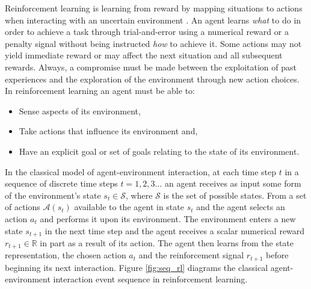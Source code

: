 Reinforcement learning is learning from reward by mapping situations to actions
when interacting with an uncertain environment \cite{suttonbarto:1998}.  An
agent learns \textit{what} to do in order to achieve a task through
trial-and-error using a numerical reward or a penalty signal without being
instructed \textit{how} to achieve it.  Some actions may not
yield immediate reward or may affect the next situation and all subsequent
rewards.  Always, a compromise must be made between the exploitation of past
experiences and the exploration of the environment through new action choices.
In reinforcement learning an agent must be able to:
\begin{itemize}
  \item Sense aspects of its environment,
  \item Take actions that influence its environment and,
  \item Have an explicit goal or set of goals relating to the state of its
  environment.
\end{itemize}

In the classical model of agent-environment interaction, at each time step $t$
in a sequence of discrete time steps $t = 1,2,3\dotsc$ an agent receives as
input some form of the environment's state $s_t \in \mathscr{S}$, where
$\mathscr{S}$ is the set of possible states.  From a set of actions
$\mathscr{A}(s_t)$ available to the agent in state $s_t$ and the agent selects
an action $a_t$ and performs it upon its environment.  The environment enters a
new state $s_{t+1}$ in the next time step and the agent receives a scalar
numerical reward $r_{t+1} \in \mathbb{R}$ in part as a result of its action.
The agent then learns from the state representation, the
chosen action $a_t$ and the reinforcement signal $r_{t+1}$ before beginning
its next interaction.  Figure \ref{fig:seq_rl} diagrams the classical
agent-environment interaction event sequence in reinforcement learning.

